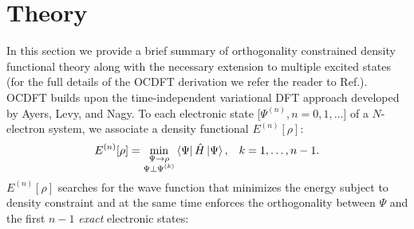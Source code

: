 \documentclass[8.5pt,twoside,twocolumn]{article}
\newcommand{\bra}[2][0]
{\ifthenelse{\equal{#1}{0}}{\left\langle #2 \right|}
{\ifthenelse{\equal{#1}{1}}{\big\langle #2 \big|}
{\ifthenelse{\equal{#1}{2}}{\Big\langle #2 \Big|}
{\ifthenelse{\equal{#1}{3}}{\bigg\langle #2 \bigg|}
{\ifthenelse{\equal{#1}{4}}{\Bigg\langle #2 \Bigg|}
{Error}}}}}
}
\newcommand{\ket}[2][0]
{\ifthenelse{\equal{#1}{0}}{\left| #2 \right\rangle}
{\ifthenelse{\equal{#1}{1}}{\big| #2 \big\rangle}
{\ifthenelse{\equal{#1}{2}}{\Big| #2 \Big\rangle}
{\ifthenelse{\equal{#1}{3}}{\bigg| #2 \bigg\rangle}
{\ifthenelse{\equal{#1}{4}}{\Bigg| #2 \Bigg\rangle}
{Error}}}}}
}
\begin{document}
\section{Theory}
In this section we provide a brief summary of orthogonality constrained density functional theory along with the necessary extension to multiple excited states (for the full details of the OCDFT derivation we refer the reader to Ref.).
OCDFT builds upon the time-independent variational DFT approach developed by Ayers, Levy, and Nagy.\cite{ayers_time-independent_2012}
To each electronic state [$\Psi^{(n)}, n=0,1,\ldots$] of a $N$-electron system, we associate a density functional $E^{(n)}[\rho]$:
\begin{equation}
E^{(n)}[\rho] = \min_{
\substack{
\Psi \rightarrow \rho\\
\Psi\bot\Psi^{(k)}
}
}
\bra{\Psi}\hat{H}\ket{\Psi},
\;\;\; k = 1,\ldots,n-1.
\end{equation}
$E^{(n)}[\rho]$ searches for the wave function that minimizes the energy subject to density constraint and at the same time enforces the orthogonality between $\Psi$ and the first $n-1$ \textit{exact} electronic states:
\end{document}

